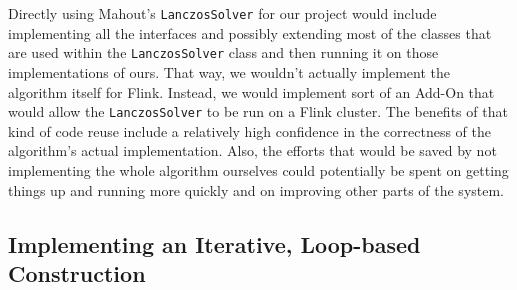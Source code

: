 
Directly using Mahout's \texttt{LanczosSolver} for our project would include implementing all
the interfaces and possibly extending most of the classes that are used within the
\texttt{LanczosSolver} class and then running it on those implementations of ours. That way, we
wouldn't actually implement the algorithm itself for Flink. Instead, we would implement sort of
an Add-On that would allow the \texttt{LanczosSolver} to be run on a Flink cluster. The benefits
of that kind of code reuse include a relatively high confidence in the correctness of the
algorithm's actual implementation. Also, the efforts that would be saved by not implementing the
whole algorithm ourselves could potentially be spent on getting things up and running more
quickly and on improving other parts of the system.

\subsection{Implementing an Iterative, Loop-based Construction}






